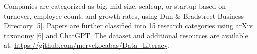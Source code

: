 \documentclass{article}
\begin{document}
Companies are categorized as big, mid-size, scaleup, or startup based on turnover, employee count, and growth rates, using Dun \& Bradstreet Business Directory [5]. Papers are further classified into 15 research categories using arXiv taxonomy [6] and ChatGPT. The dataset and additional resources are available at: \url{https://github.com/mervekocabas/Data_Literacy}.



\end{document}
